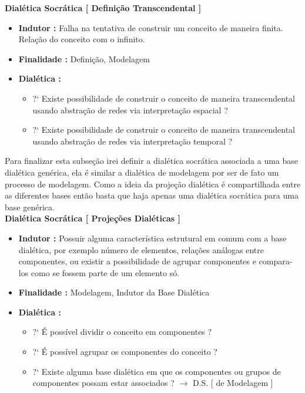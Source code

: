 \documentclass[10pt,a4paper]{report}
\begin{document}
\hspace{\baselineskip}

\textbf{Dialética Socrática [ Definição Transcendental ]}

\begin{itemize}
	\item[ ] \textbf{Indutor :} Falha na tentativa de construir um conceito de maneira finita. Relação do conceito com o infinito.
	\item[ ] \textbf{Finalidade :} Definição, Modelagem
	\item[ ] \textbf{Dialética :}
	\begin{itemize}
		\item[ ] ?` Existe possibilidade de construir o conceito de maneira transcendental usando abstração de redes via interpretação espacial ?
		\item[ ] ?` Existe possibilidade de construir o conceito de maneira transcendental usando abstração de redes via interpretação temporal ?
	\end{itemize}
\end{itemize}

Para finalizar esta subseção irei definir a dialética socrática associada a uma base dialética genérica, ela é similar a dialética de modelagem por ser de fato um processo de modelagem. Como a ideia da projeção dialética é compartilhada entre as diferentes bases então basta que haja apenas uma dialética socrática para uma base genérica. \\

\textbf{Dialética Socrática [ Projeções Dialéticas ]}

\begin{itemize}
	\item[ ] \textbf{Indutor :} Possuir alguma característica estrutural em comum com a base dialética, por exemplo número de elementos, relações análogas entre componentes, ou existir a possibilidade de agrupar componentes e compara-los como se fossem parte de um elemento só.
	\item[ ] \textbf{Finalidade :} Modelagem, Indutor da Base Dialética
	\item[ ] \textbf{Dialética :}
	\begin{itemize}
		\item[ ] ?` É possível dividir o conceito em componentes ?
		\item[ ] ?` É possível agrupar os componentes do conceito ?
		\item[ ] ?` Existe alguma base dialética em que os componentes ou grupos de componentes possam estar associados ? $\rightarrow$ D.S. [ de Modelagem ]
	\end{itemize}
\end{itemize}
\end{document}
